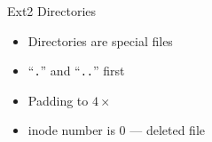 \begin{frame}{Ext2 Directories}
  \begin{center}
  \end{center}
  \begin{minipage}{.39\textwidth}
    \begin{center}
    \end{center}
  \end{minipage}\quad
  \begin{minipage}{.55\textwidth}
    \begin{itemize}
    \item Directories are special files
    \item ``\texttt{.}'' and ``\texttt{..}'' first
    \item Padding to $4\times{}$
    \item inode number is 0 --- deleted file
    \end{itemize}
  \end{minipage}
\end{frame}


